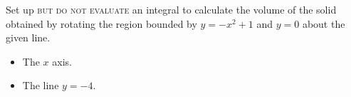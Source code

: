 \label{problemVolumeRevolution-x^2+1aroundy=0andy=-4}
Set up \textsc{but do not evaluate} an integral to calculate the volume of the solid obtained by rotating the region bounded by $y=-x^2+1$ and $y=0$ about the given line. 
\begin{itemize}
\item The $x$ axis.
\item The line $y=-4$.
\end{itemize}